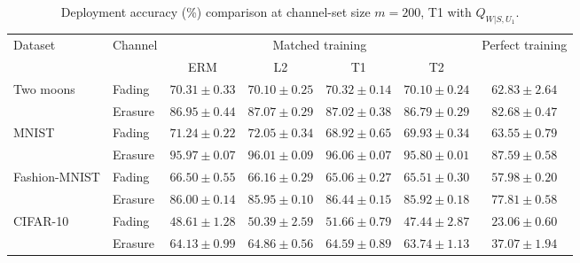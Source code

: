 \begin{table}[htb]
\centering
\caption{Deployment accuracy (\%) comparison at channel-set size $m=200$, T1 with $Q_{W|S,U_1}$.}
\label{tab:performance}
\begin{tabular*}{\linewidth}{@{\extracolsep{\fill}}llccccc@{}}
\toprule
\multirow{2}{*}{Dataset} & \multirow{2}{*}{Channel}
& \multicolumn{4}{c}{Matched training} & \multirow{2}{*}{Perfect training} \\
\cmidrule(lr){3-6}
& & ERM & L2 & T1 & T2 &  \\
\midrule
\multirow{2}{*}{Two moons}
& Fading
& $70.31\pm0.33$ & $70.10\pm0.25$ & $\mathbf{70.32}\pm0.14$ & $70.10\pm0.24$ & $62.83\pm2.64$ \\
& Erasure
& $86.95\pm0.44$ & $\mathbf{87.07}\pm0.29$ & $87.02\pm0.38$ & $86.79\pm0.29$ & $82.68\pm0.47$ \\
\midrule
\multirow{2}{*}{MNIST}
& Fading
& $71.24\pm0.22$ & $\mathbf{72.05}\pm0.34$ & $68.92\pm0.65$ & $69.93\pm0.34$ & $63.55\pm0.79$ \\
& Erasure
& $95.97\pm0.07$ & $96.01\pm0.09$ & $\mathbf{96.06}\pm0.07$ & $95.80\pm0.01$ & $87.59\pm0.58$ \\
\midrule
\multirow{2}{*}{Fashion-MNIST}
& Fading
& $\mathbf{66.50}\pm0.55$ & $66.16\pm0.29$ & $65.06\pm0.27$ & $65.51\pm0.30$ & $57.98\pm0.20$ \\
& Erasure
& $86.00\pm0.14$ & $85.95\pm0.10$ & $\mathbf{86.44}\pm0.15$ & $85.92\pm0.18$ & $77.81\pm0.58$ \\
\midrule
\multirow{2}{*}{CIFAR-10}
& Fading
& $48.61\pm1.28$ & $50.39\pm2.59$ & $\mathbf{51.66}\pm0.79$ & $47.44\pm2.87$ & $23.06\pm0.60$ \\
& Erasure
& $64.13\pm0.99$ & $\mathbf{64.86}\pm0.56$ & $64.59\pm0.89$ & $63.74\pm1.13$ & $37.07\pm1.94$ \\
\bottomrule
\end{tabular*}
\end{table}
